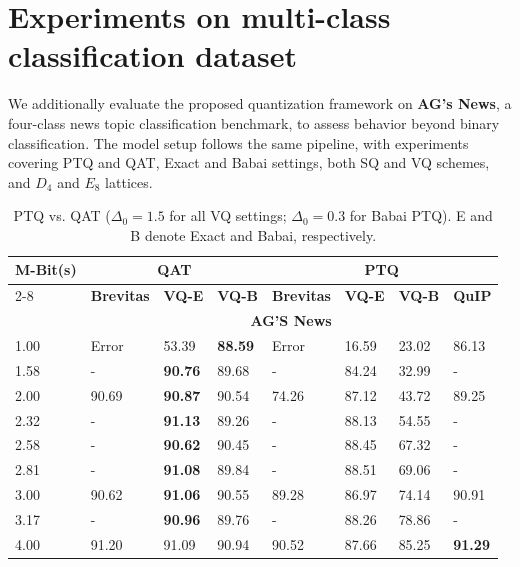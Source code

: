\documentclass{article}
\theoremstyle{definition}
\theoremstyle{remark}
\begin{document}
\section{Experiments on multi-class classification dataset}
We additionally evaluate the proposed quantization framework on \textbf{AG’s News}, a four-class news topic classification benchmark, to assess behavior beyond binary classification. The model setup follows the same pipeline, with experiments covering PTQ and QAT, Exact and Babai settings, both SQ and VQ schemes, and $D_4$ and $E_8$ lattices.
\begin{table}[h]
    \centering
    \tiny
    \caption{PTQ vs. QAT ($\Delta_0=1.5$ for all VQ settings; $\Delta_0=0.3$ for Babai PTQ). E and B denote Exact and Babai, respectively.}
    \label{ptqvsQAT-1_news}
    \begin{tabular}{| p{0.9cm}|p{0.7cm}|p{0.7cm}|p{0.7cm}|p{0.6cm}|p{0.6cm}|p{0.6cm}|p{0.6cm}|} \hline
\textbf{M-Bit(s)} & \multicolumn{3}{|c}{\textbf{QAT}} & \multicolumn{4}{|c|}{\textbf{PTQ}} \\ \cline{2-8}
& \textbf{Brevitas} & \textbf{VQ-E} &\textbf{ VQ-B} & \textbf{Brevitas} & \textbf{VQ-E} & \textbf{VQ-B} &\textbf{ QuIP}  \\ \hline
\rowcolor{black!20}
& \multicolumn{7}{c|}{\textbf{AG'S News}}\\ \hline

1.00	& Error    & 53.39 & \textbf{88.59} & Error & 16.59 & 23.02 & 86.13 \\

1.58 & -	& \textbf{90.76} & 89.68 &    -   & 84.24 & 32.99 & - \\

2.00	& 90.69    & \textbf{90.87} & 90.54 & 74.26 & 87.12 & 43.72 & 89.25\\

2.32 &    -      & \textbf{91.13} & 89.26 &   -    & 88.13& 54.55 & -\\

2.58 &  -		& \textbf{90.62} & 90.45 &    -   & 88.45 & 67.32 & -\\

2.81 &  -		& \textbf{91.08} & 89.84 &   -    & 88.51 & 69.06 & -\\

3.00	& 	 90.62 	& \textbf{91.06} & 90.55 & 89.28 & 86.97& 74.14 & 90.91 \\

3.17 &  - & \textbf{90.96} & 89.76 &   -     & 88.26& 78.86 & - \\

4.00	&  91.20 	& 91.09 & 90.94 & 90.52 & 87.66& 85.25 & \textbf{91.29} \\ \hline

    \end{tabular}
    \end{table}
\end{document}
